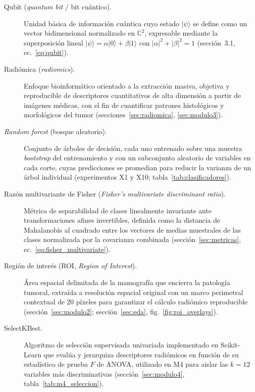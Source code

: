 \begin{description}
  \item[Qubit (\textit{quantum bit} / bit cuántico).] Unidad básica de información cuántica cuyo estado $|\psi\rangle$ se define como un vector bidimensional normalizado en $\mathbb{C}^2$, expresable mediante la superposición lineal $|\psi\rangle = \alpha|0\rangle + \beta|1\rangle$ con $|\alpha|^2 + |\beta|^2 = 1$ (sección~3.1, ec.~\ref{eq:qubit}).


  \item[Radiómica (\textit{radiomics}).] Enfoque bioinformático orientado a la extracción masiva, objetiva y reproducible de descriptores cuantitativos de alta dimensión a partir de imágenes médicas, con el fin de cuantificar patrones histológicos y morfológicos del tumor (secciones~\ref{sec:radiomica}, \ref{sec:modulo3}).

  \item[\textit{Random forest} (bosque aleatorio).] Conjunto de árboles de decisión, cada uno entrenado sobre una muestra \textit{bootstrap} del entrenamiento y con un subconjunto aleatorio de variables en cada corte, cuyas predicciones se promedian para reducir la varianza de un árbol individual (experimentos X1 y X10; tabla~\ref{tab:clasificadores}).

  \item[Razón multivariante de Fisher (\textit{Fisher's multivariate discriminant ratio}).] Métrica de separabilidad de clases linealmente invariante ante transformaciones afines invertibles, definida como la distancia de Mahalanobis al cuadrado entre los vectores de medias muestrales de las clases normalizada por la covarianza combinada (sección~\ref{sec:metricas}, ec.~\ref{eq:fisher_multivariate}).

  \item[Región de interés (ROI, \textit{Region of Interest}).] Área espacial delimitada de la mamografía que encierra la patología tumoral, extraída a resolución espacial original con un marco perimetral contextual de 20 píxeles para garantizar el cálculo radiómico reproducible (sección~\ref{sec:modulo2}; sección~\ref{sec:eda}, fig.~\ref{fig:roi_overlays}).

  \item[SelectKBest.] Algoritmo de selección supervisada univariada implementado en Scikit-Learn que evalúa y jerarquiza descriptores radiómicos en función de su estadístico de prueba $F$ de ANOVA, utilizado en M4 para aislar las $k=12$ variables más discriminativas (sección~\ref{sec:modulo4}, tabla~\ref{tab:m4_seleccion}).


\end{description}
